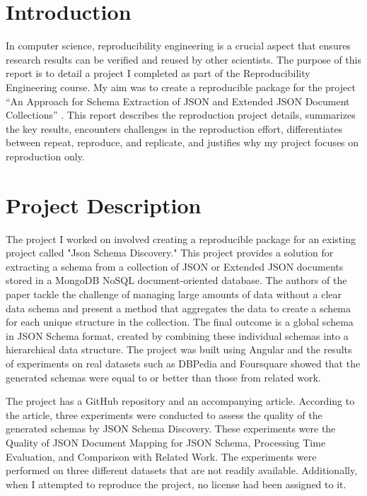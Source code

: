\documentclass[sigconf]{acmart}
\begin{document}
\section*{Introduction}
In computer science, reproducibility engineering is a crucial aspect that ensures research results can be verified and reused by other scientists. The purpose of this report is to detail a project I completed as part of the Reproducibility Engineering course. My aim was to create a reproducible package for the project ``An Approach for Schema Extraction of JSON and Extended JSON Document Collections'' \cite{8424731}. This report describes the reproduction project details, summarizes the key results, encounters challenges in the reproduction effort, differentiates between repeat, reproduce, and replicate, and justifies why my project focuses on reproduction only.


\section*{Project Description}
The project I worked on involved creating a reproducible package for an existing project called "Json Schema Discovery." This project provides a solution for extracting a schema from a collection of JSON or Extended JSON documents stored in a MongoDB NoSQL document-oriented database. The authors of the paper tackle the challenge of managing large amounts of data without a clear data schema and present a method that aggregates the data to create a schema for each unique structure in the collection. The final outcome is a global schema in JSON Schema format, created by combining these individual schemas into a hierarchical data structure. The project was built using Angular and the results of experiments on real datasets such as DBPedia and Foursquare showed that the generated schemas were equal to or better than those from related work.

The project has a GitHub repository and an accompanying article. According to the article, three experiments were conducted to assess the quality of the generated schemas by JSON Schema Discovery. These experiments were the Quality of JSON Document Mapping for JSON Schema, Processing Time Evaluation, and Comparison with Related Work. The experiments were performed on three different datasets that are not readily available. Additionally, when I attempted to reproduce the project, no license had been assigned to it.
\end{document}
